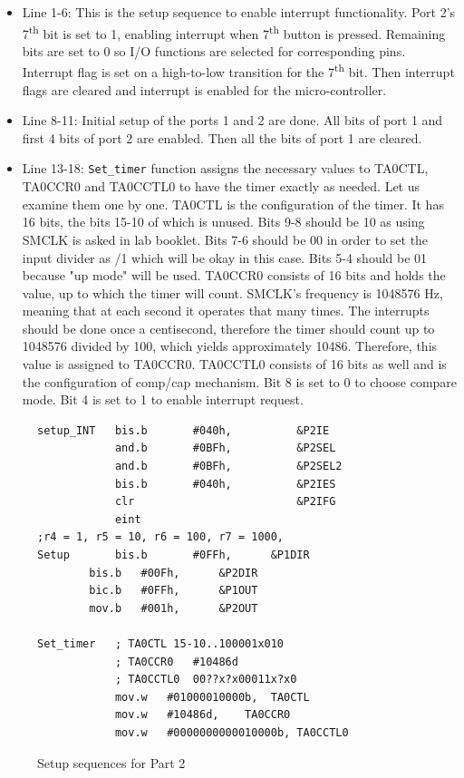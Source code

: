 \documentclass[pdftex,12pt,a4paper]{article}
\begin{document}
\begin{itemize}
    \item Line 1-6: This is the setup sequence to enable interrupt functionality. Port 2's 7\textsuperscript{th} bit is set to 1, enabling interrupt when 7\textsuperscript{th} button is pressed. Remaining bits are set to 0 so I/O functions are selected for corresponding pins. Interrupt flag is set on a high-to-low transition for the 7\textsuperscript{th} bit. Then interrupt flags are cleared and interrupt is enabled for the micro-controller.
    
    \item Line 8-11: Initial setup of the ports 1 and 2 are done. All bits of port 1 and first 4 bits of port 2 are enabled. Then all the bits of port 1 are cleared.
    
    \item Line 13-18: \texttt{Set\_timer} function assigns the necessary values to TA0CTL, TA0CCR0 and TA0CCTL0 to have the timer exactly as needed. Let us examine them one by one.
    \newline
    TA0CTL is the configuration of the timer. It has 16 bits, the bits 15-10 of which is unused. Bits 9-8 should be 10 as using SMCLK is asked in lab booklet. Bits 7-6 should be 00 in order to set the input divider as /1 which will be okay in this case. Bits 5-4 should be 01 because "up mode" will be used.
    \newline
    TA0CCR0 consists of 16 bits and holds the value, up to which the timer will count. SMCLK's frequency is 1048576 Hz, meaning that at each second it operates that many times. The interrupts should be done once a centisecond, therefore the timer should count up to 1048576 divided by 100, which yields approximately 10486. Therefore, this value is assigned to TA0CCR0.
    \newline
    TA0CCTL0 consists of 16 bits as well and is the configuration of comp/cap mechanism. Bit 8 is set to 0 to choose compare mode. Bit 4 is set to 1 to enable interrupt request.
    
\end{itemize}
\begin{figure}[H]
    \centering
    \begin{lstlisting}[language={[x86masm]Assembler}]
setup_INT   bis.b       #040h,          &P2IE       
            and.b       #0BFh,          &P2SEL      
            and.b       #0BFh,          &P2SEL2
            bis.b       #040h,          &P2IES
            clr                         &P2IFG 
            eint    
;r4 = 1, r5 = 10, r6 = 100, r7 = 1000,
Setup	    bis.b       #0FFh,		&P1DIR
	    bis.b	#00Fh,		&P2DIR
	    bic.b	#0FFh,		&P1OUT
	    mov.b	#001h,		&P2OUT

Set_timer	; TA0CTL 15-10..100001x010
			; TA0CCR0	#10486d
			; TA0CCTL0  00??x?x00011x?x0
			mov.w	#01000010000b,	TA0CTL
			mov.w	#10486d,	TA0CCR0
			mov.w	#0000000000010000b,	TA0CCTL0

    \end{lstlisting}
    \label{code:part1delay}
    \caption{Setup sequences for Part 2}
\end{figure}
\end{document}

